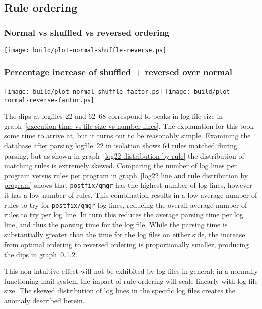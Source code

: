 \documentclass[a4paper,12pt,draft]{article}
\begin{document}
\subsection{Rule ordering}

\label{rule ordering graphs}

\subsubsection{Normal vs shuffled vs reversed ordering}
\label{normal vs shuffled vs reversed ordering}
\texttt{[image: build/plot-normal-shuffle-reverse.ps]}

\subsubsection{Percentage increase of shuffled + reversed over normal}
\label{normal vs shuffled vs reversed ordering factor}
\texttt{[image: build/plot-normal-shuffle-factor.ps]}
\newline
\texttt{[image: build/plot-normal-reverse-factor.ps]}

The dips at logfiles 22 and 62--68 correspond to peaks in log file size in
graph~\ref{execution time vs file size vs number lines}.  The explanation
for this took some time to arrive at, but it turns out to be reasonably
simple.  Examining the database after parsing logfile~22 in isolation shows
64 rules matched during parsing, but as shown in graph~\ref{log22
distribution by rule} the distribution of matching rules is extremely
skewed.  Comparing the number of log lines per program versus rules per
program in graph~\ref{log22 line and rule distribution by program} shows
that \texttt{postfix/qmgr} has the highest number of log lines, however it
has a low number of rules.  This combination results in a low average
number of rules to try for \texttt{postfix/qmgr} log lines, reducing the
overall average number of rules to try per log line.  In turn this reduces
the average parsing time per log line, and thus the parsing time for the
log file.  While the parsing time is substantially greater than the time
for the log files on either side, the increase from optimal ordering to
reversed ordering is proportionally smaller, producing the dips in
graph~\ref{normal vs shuffled vs reversed ordering factor}.

This non-intuitive effect will not be exhibited by log files in general: in
a normally functioning mail system the impact of rule ordering will scale
linearly with log file size.  The skewed distribution of log lines in the
specific log files creates the anomaly described herein.
\end{document}
